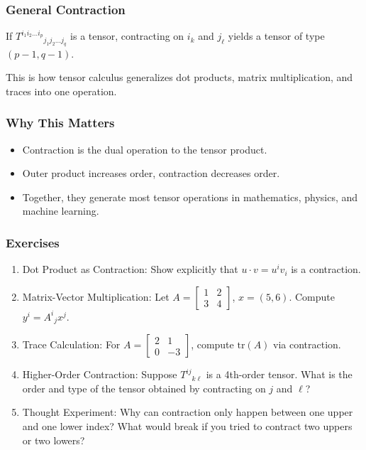 \documentclass[
  letterpaper,
  DIV=11,
  numbers=noendperiod]{scrreprt}
\providecommand{\tightlist}{%
  \setlength{\itemsep}{0pt}\setlength{\parskip}{0pt}}
\begin{document}
\subsubsection{General Contraction}\label{general-contraction}

If \(T^{i_1 i_2 \dots i_p}{}_{j_1 j_2 \dots j_q}\) is a tensor,
contracting on \(i_k\) and \(j_\ell\) yields a tensor of type
\((p-1, q-1)\).

This is how tensor calculus generalizes dot products, matrix
multiplication, and traces into one operation.

\subsubsection{Why This Matters}\label{why-this-matters-11}

\begin{itemize}
\tightlist
\item
  Contraction is the dual operation to the tensor product.
\item
  Outer product increases order, contraction decreases order.
\item
  Together, they generate most tensor operations in mathematics,
  physics, and machine learning.
\end{itemize}

\subsubsection{Exercises}\label{exercises-21}

\begin{enumerate}
\def\labelenumi{\arabic{enumi}.}
\item
  Dot Product as Contraction: Show explicitly that
  \(u \cdot v = u^i v_i\) is a contraction.
\item
  Matrix-Vector Multiplication: Let
  \(A = \begin{bmatrix}1 & 2 \\ 3 & 4\end{bmatrix}\), \(x=(5,6)\).
  Compute \(y^i = A^i{}_j x^j\).
\item
  Trace Calculation: For
  \(A = \begin{bmatrix}2 & 1 \\ 0 & -3\end{bmatrix}\), compute
  \(\mathrm{tr}(A)\) via contraction.
\item
  Higher-Order Contraction: Suppose \(T^{ij}{}_{k\ell}\) is a 4th-order
  tensor. What is the order and type of the tensor obtained by
  contracting on \(j\) and \(\ell\)?
\item
  Thought Experiment: Why can contraction only happen between one upper
  and one lower index? What would break if you tried to contract two
  uppers or two lowers?
\end{enumerate}
\end{document}
